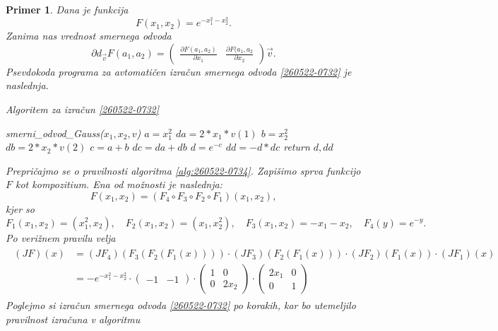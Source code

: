\documentclass[12pt,slovene]{article}
\newtheorem{primer}{Primer}
\begin{document}
\begin{primer}\label{260522-0920}
Dana je funkcija
    $$F(x_{1},x_{2})=e^{-x_1^2-x_2^2}.$$
Zanima nas vrednost smernega odvoda 
\begin{equation}\label{260522-0732}
\partial d_{\vec{v}}F(a_1,a_2)=
\begin{pmatrix}
\frac{\partial F(a_1,a_2)}{\partial x_1} &
\frac{\partial F(a_1,a_2}{\partial x_2}
\end{pmatrix}\vec{v}.
\end{equation}
Psevdokoda programa za avtomatičen izračun
smernega odvoda \eqref{260522-0732} je naslednja.

\begin{algorithm}[H]
\caption{Algoritem za izračun \eqref{260522-0732} }\label{alg:260522-0734}
\begin{algorithmic}\State
smerni\_odvod\_Gauss($x_1,x_2,v$)
\State\quad $a=x_1^2$
\State\quad $da=2*x_1*v(1)$
\State\quad $b=x_2^2$
\State\quad $db=2*x_2*v(2)$
\State\quad $c=a+b$
\State\quad $dc=da+db$
\State\quad $d=e^{-c}$
\State\quad $dd=-d*dc$
\State\quad return $d,dd$
\end{algorithmic}
 \end{algorithm}
Prepričajmo se o pravilnosti algoritma
\eqref{alg:260522-0734}.
Zapišimo sprva funkcijo $F$ kot kompozitium.
Ena od možnosti je naslednja:
\begin{equation}\label{260522-0928}
F(x_1,x_2)=(F_4\circ F_3\circ F_2\circ F_1)(x_1,x_2),
\end{equation}
kjer so
$$F_1(x_1,x_2)=(x_1^2,x_2),\quad
F_2(x_1,x_2)=(x_1,x_2^2),\quad
F_3(x_1,x_2)=-x_1-x_2,\quad
F_4(y)=e^{-y}.$$
Po verižnem pravilu velja
\begin{align}\label{260522-0929}
\begin{split}
(JF)(x)
&=
(JF_4)(F_3(F_2(F_1(x))))\cdot
(JF_3)(F_2(F_1(x)))\cdot
(JF_2)(F_1(x))\cdot
(JF_1)(x)\\
&=
-e^{-x_1^2-x_2^2}\cdot
\begin{pmatrix}
-1 & -1
\end{pmatrix}\cdot
\begin{pmatrix}
1 & 0\\
0 & 2x_2
\end{pmatrix}\cdot
\begin{pmatrix}
2x_1 & 0\\
0 & 1
\end{pmatrix}
\end{split}
\end{align}
Poglejmo si izračun smernega odvoda \eqref{260522-0732} po korakih, kar bo utemeljilo pravilnost izračuna v algoritmu 

\end{primer}
\end{document}
